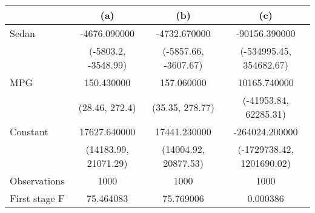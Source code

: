 \begin{tabular}{lccc}
\toprule
 & (a) & (b) & (c) \\
\midrule
Sedan & -4676.090000 & -4732.670000 & -90156.390000 \\
  & (-5803.2, -3548.99) & (-5857.66, -3607.67) & (-534995.45, 354682.67) \\
MPG & 150.430000 & 157.060000 & 10165.740000 \\
 & (28.46, 272.4) & (35.35, 278.77) & (-41953.84, 62285.31) \\
Constant & 17627.640000 & 17441.230000 & -264024.200000 \\
 & (14183.99, 21071.29) & (14004.92, 20877.53) & (-1729738.42, 1201690.02) \\
Observations & 1000 & 1000 & 1000 \\
First stage F & 75.464083 & 75.769006 & 0.000386 \\
\bottomrule
\end{tabular}
